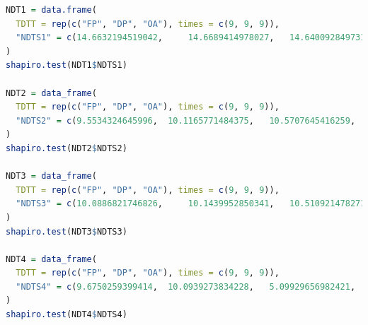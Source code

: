 \documentclass{article}
\begin{document}
\begin{lstlisting}[language=R, caption= C\'odigo utilizado para hacer pruebas de normalidad seg\'un el orden en que se ejecutan las tareas.]
NDT1 = data.frame(
  TDTT = rep(c("FP", "DP", "OA"), times = c(9, 9, 9)),
  "NDTS1" = c(14.6632194519042, 	14.6689414978027, 	14.6400928497314, 	14.7817134857177, 	10.1368427276611, 	16.0033702850341, 	15.1014328002929, 	14.5940780639648, 	19.763708114624, 	15.0637626647949, 	8.00037384033203, 	20.5345153808593, 	14.9371623992919, 	15.2616500854492, 	15.5577659606933, 	13.9107704162597, 	19.8197364807128, 	19.3409919738769, 	20.5903053283691, 	17.2526836395263, 	9.84764099121093, 	15.1457786560058, 	15.122652053833, 	15.3250694274902, 	19.301414489746, 	22.6647853851318, 	13.5760307312011)
)
shapiro.test(NDT1$NDTS1)

NDT2 = data_frame(
  TDTT = rep(c("FP", "DP", "OA"), times = c(9, 9, 9)),
  "NDTS2" = c(9.5534324645996, 	10.1165771484375, 	10.5707645416259, 	10.1063251495361, 	10.0808143615722, 	9.58919525146484, 	9.85145568847656, 	11.9268894195556, 	9.95707511901855, 	9.93013381958007, 	3.55696678161621, 	9.91225242614746, 	10.1029872894287, 	9.59086418151855, 	10.1222991943359, 	14.8596763610839, 	15.1095390319824, 	5.00893592834472, 	9.58704948425292, 	10.1697444915771, 	10.23530960083, 	9.61017608642578, 	9.20867919921875, 	9.60993766784667, 	9.87768173217773, 	9.60707664489746, 	9.50002670288085)
)
shapiro.test(NDT2$NDTS2)

NDT3 = data_frame(
  TDTT = rep(c("FP", "DP", "OA"), times = c(9, 9, 9)),
  "NDTS3" = c(10.0886821746826, 	10.1439952850341, 	10.5109214782714, 	4.04214859008789, 	10.0753307342529, 	9.83428955078125, 	9.97304916381835, 	10.3750228881835, 	9.69386100769042, 	0, 	9.85026359558105, 	10.1709365844726, 	9.75704193115234, 	9.92989540100097, 	10.394811630249, 	10.3027820587158, 	8.60190391540527, 	5.08999824523925, 	7.99918174743652, 	9.51886177062988, 	0, 	10.2787017822265, 	10.3039741516113, 	8.00061225891113, 	14.5168304443359, 	9.90939140319824, 	0)
)
shapiro.test(NDT3$NDTS3)

NDT4 = data_frame(
  TDTT = rep(c("FP", "DP", "OA"), times = c(9, 9, 9)),
  "NDTS4" = c(9.6750259399414, 	10.0939273834228, 	5.09929656982421, 	9.71102714538574, 	9.9799633026123, 	10.0970268249511, 	0, 	8.00085067749023, 	9.92918014526367, 	9.59515571594238, 	5.56445121765136, 	5.07974624633789, 	10.1842880249023, 	9.59181785583496, 	0, 	5.00750541687011, 	10.0986957550048, 	10.1239681243896, 	5.04970550537109, 	10.1282596588134, 	5.0969123840332, 	5.04279136657714, 	10.2267265319824, 	5.08332252502441, 	5.0661563873291, 	9.28521156311035, 	0)
)
shapiro.test(NDT4$NDTS4)
\end{lstlisting}
\end{document}
